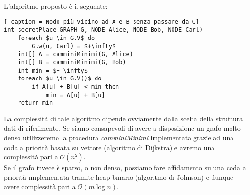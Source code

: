 \documentclass[../cheatSheetAlgoritmi.tex]{subfiles}
\begin{document}
L'algoritmo proposto è il seguente: 
\begin{lstlisting}[ caption = Nodo più vicino ad A e B senza passare da C]
int secretPlace(GRAPH G, NODE Alice, NODE Bob, NODE Carl)
	foreach $u \in G.V$ do
		G.w(u, Carl) = $+\infty$
	int[] A = camminiMinimi(G, Alice)
	int[] B = camminiMinimi(G, Bob)
	int min = $+ \infty$
	foreach $u \in G.V()$ do
		if A[u] + B[u] < min then
			min = A[u] + B[u]
	return min
\end{lstlisting}
La complessità di tale algoritmo dipende ovviamente dalla scelta della struttura dati di riferimento. Se siamo consapevoli di avere a disposizione un grafo molto denso utilizzeremo la procedura \emph{camminiMinimi} implementata grazie ad una coda a priorità basata su vettore (algoritmo di Dijkstra) e avremo una complessità pari a $\mathcal{O}(n^2)$. \\
Se il grafo invece è sparso, o non denso, possiamo fare affidamento su una coda a priorità implementata tramite heap binario (algoritmo di Johnson) e dunque avere complessità pari a $\mathcal{O}(m \log n)$.
\newpage
\end{document}
